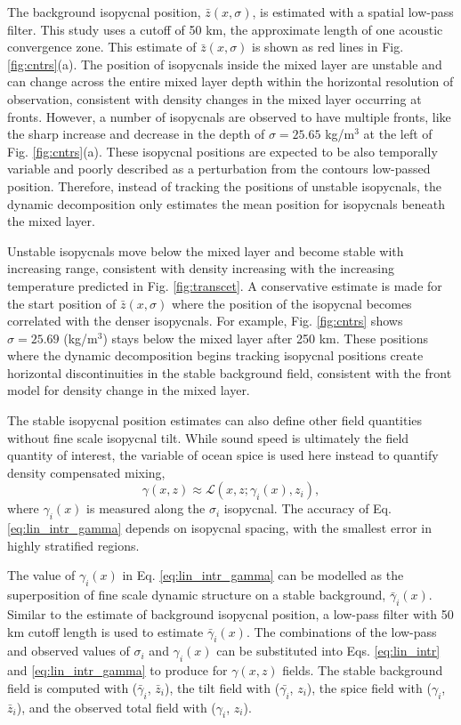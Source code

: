 \documentclass[preprint,NumberedRefs]{JASA}
\begin{document}
The background isopycnal position, $\bar{z}(x, \sigma)$, is estimated with a spatial low-pass filter. This study uses a cutoff of 50 km, the approximate length of one acoustic convergence zone\cite{jensen2011computational}. This estimate of $\bar{z}(x, \sigma)$ is shown as red lines in Fig. \ref{fig:cntrs}(a). The position of isopycnals inside the mixed layer are unstable and can change across the entire mixed layer depth within the horizontal resolution of observation, consistent with density changes in the mixed layer occurring at fronts. However, a number of isopycnals are observed to have multiple fronts, like the sharp increase and decrease in the depth of $\sigma=25.65$ kg/m$^3$ at the left of Fig. \ref{fig:cntrs}(a). These isopycnal positions are expected to be also temporally variable and poorly described as a perturbation from the contours low-passed position. Therefore, instead of tracking the positions of unstable isopycnals, the dynamic decomposition only estimates the mean position for isopycnals beneath the mixed layer.

Unstable isopycnals move below the mixed layer and become stable with increasing range, consistent with density increasing with the increasing temperature predicted in Fig. \ref{fig:transcet}. A conservative estimate is made for the start position of $\bar{z}(x, \sigma)$ where the position of the isopycnal becomes correlated with the denser isopycnals. For example, Fig. \ref{fig:cntrs} shows $\sigma=25.69$ (kg/m$^3$) stays below the mixed layer after 250 km. These positions where the dynamic decomposition begins tracking isopycnal positions create horizontal discontinuities in the stable background field, consistent with the front model for density change in the mixed layer.

The stable isopycnal position estimates can also define other field quantities without fine scale isopycnal tilt. While sound speed is ultimately the field quantity of interest, the variable of ocean spice is used here instead to quantify density compensated mixing,
\begin{equation}
    \gamma(x, z)\approx\mathcal{L}(x, z; \gamma_i(x), z_i),
    \label{eq:lin_intr_gamma}
\end{equation}
where $\gamma_i(x)$ is measured along the $\sigma_i$ isopycnal. The accuracy of Eq. \eqref{eq:lin_intr_gamma} depends on isopycnal spacing, with the smallest error in highly stratified regions.

The value of $\gamma_i(x)$ in Eq. \eqref{eq:lin_intr_gamma} can be modelled as the superposition of fine scale dynamic structure on a stable background, $\bar{\gamma}_i(x)$. Similar to the estimate of background isopycnal position, a low-pass filter with 50 km cutoff length is used to estimate $\bar{\gamma}_i(x)$. The combinations of the low-pass and observed values of $\sigma_i$ and $\gamma_i(x)$ can be substituted into Eqs. \eqref{eq:lin_intr} and \eqref{eq:lin_intr_gamma} to produce for $\gamma(x,z)$ fields. The stable background field is computed with ($\bar{\gamma}_i$, $\bar{z}_i$), the tilt field with ($\bar{\gamma_i}$, $z_i$), the spice field with ($\gamma_i$, $\bar{z}_i$), and the observed total field with ($\gamma_i$, $z_i$).
\end{document}
